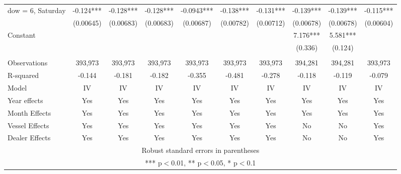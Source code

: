 \begin{tabular}{lccccccccc}
dow = 6, Saturday & -0.124*** & -0.128*** & -0.128*** & -0.0943*** & -0.138*** & -0.131*** & -0.139*** & -0.139*** & -0.115*** \\
 & (0.00645) & (0.00683) & (0.00683) & (0.00687) & (0.00782) & (0.00712) & (0.00678) & (0.00678) & (0.00604) \\
Constant &  &  &  &  &  &  & 7.176*** & 5.581*** &  \\
 &  &  &  &  &  &  & (0.336) & (0.124) &  \\
 &  &  &  &  &  &  &  &  &  \\
Observations & 393,973 & 393,973 & 393,973 & 393,973 & 393,973 & 393,973 & 394,281 & 394,281 & 393,973 \\
R-squared & -0.144 & -0.181 & -0.182 & -0.355 & -0.481 & -0.278 & -0.118 & -0.119 & -0.079 \\
Model & IV & IV & IV & IV & IV & IV & IV & IV & IV \\
Year effects & Yes & Yes & Yes & Yes & Yes & Yes & Yes & Yes & Yes \\
Month Effects & Yes & Yes & Yes & Yes & Yes & Yes & Yes & Yes & Yes \\
Vessel Effects & Yes & Yes & Yes & Yes & Yes & Yes & No & No & Yes \\
 Dealer Effects & Yes & Yes & Yes & Yes & Yes & Yes & No & No & Yes \\ \hline
\multicolumn{10}{c}{ Robust standard errors in parentheses} \\
\multicolumn{10}{c}{ *** p$<$0.01, ** p$<$0.05, * p$<$0.1} \\
\end{tabular}
